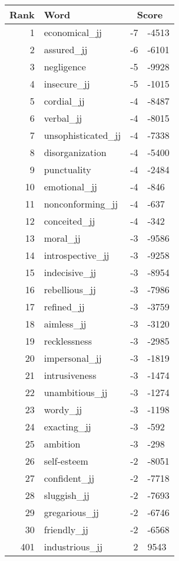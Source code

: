 \begin{longtable}[!htbp]{| rlr@{.}l |}
    \hline
    \textbf{Rank} & \textbf{Word} & \multicolumn{2}{c|}{\textbf{Score}} \\
    \hline
    \endhead
    1 & economical\_jj & -7 & -4513 \\
    2 & assured\_jj & -6 & -6101 \\
    3 & negligence & -5 & -9928 \\
    4 & insecure\_jj & -5 & -1015 \\
    5 & cordial\_jj & -4 & -8487 \\
    6 & verbal\_jj & -4 & -8015 \\
    7 & unsophisticated\_jj & -4 & -7338 \\
    8 & disorganization & -4 & -5400 \\
    9 & punctuality & -4 & -2484 \\
    10 & emotional\_jj & -4 & -846 \\
    11 & nonconforming\_jj & -4 & -637 \\
    12 & conceited\_jj & -4 & -342 \\
    13 & moral\_jj & -3 & -9586 \\
    14 & introspective\_jj & -3 & -9258 \\
    15 & indecisive\_jj & -3 & -8954 \\
    16 & rebellious\_jj & -3 & -7986 \\
    17 & refined\_jj & -3 & -3759 \\
    18 & aimless\_jj & -3 & -3120 \\
    19 & recklessness & -3 & -2985 \\
    20 & impersonal\_jj & -3 & -1819 \\
    21 & intrusiveness & -3 & -1474 \\
    22 & unambitious\_jj & -3 & -1274 \\
    23 & wordy\_jj & -3 & -1198 \\
    24 & exacting\_jj & -3 & -592 \\
    25 & ambition & -3 & -298 \\
    26 & self-esteem & -2 & -8051 \\
    27 & confident\_jj & -2 & -7718 \\
    28 & sluggish\_jj & -2 & -7693 \\
    29 & gregarious\_jj & -2 & -6746 \\
    30 & friendly\_jj & -2 & -6568 \\
    401 & industrious\_jj & 2 & 9543 \\

\end{longtable}
